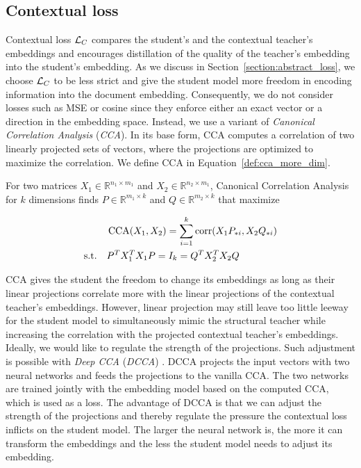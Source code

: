 \subsection{Contextual loss}\label{section:contextual_loss}

Contextual loss $\mathcal{L}_C$ compares the student's and the contextual teacher's
embeddings and encourages distillation of the quality of the teacher's
embedding into the student's embedding. As we discuss in
Section~\ref{section:abstract_loss}, we choose $\mathcal{L}_C$ to be less strict and
give the student model more freedom in encoding information into the
document embedding. Consequently, we do not consider losses such as MSE or
cosine since they enforce either an exact vector or a direction in the
embedding space. Instead, we use a variant of \emph{Canonical Correlation
Analysis} \citep{hotelling1992relations} (\emph{CCA}). In its base form, CCA
computes a correlation of two linearly projected sets of vectors, where the
projections are optimized to maximize the correlation. We define CCA
in Equation~\ref{def:cca_more_dim}.

\begin{defn}\label{def:cca_more_dim}

  For two matrices $X_1 \in \mathbb{R}^{n_1 \times m_1}$ and $X_2 \in
  \mathbb{R}^{n_2 \times m_1}$, Canonical Correlation Analysis for $k$
  dimensions finds $P \in \mathbb{R}^{m_1 \times k}$ and $Q \in \mathbb{R}^{m_2
  \times k}$ that maximize

  \begin{equation}
    \begin{split}
      &\operatorname*{CCA}(X_1, X_2) = \sum_{i = 1}^k \operatorname*{corr}(X_1P_{*i}, X_2Q_{*i}) \\
      \text{s.t.}\quad &P^TX_1^TX_1P = I_k = Q^TX_2^TX_2Q \\
    \end{split}
  \end{equation}


\end{defn}

CCA gives the student the freedom to change its embeddings as long as their
linear projections correlate more with the linear projections of the contextual
teacher's embeddings. However, linear projection may still leave too little
leeway for the student model to simultaneously mimic the structural teacher
while increasing the correlation with the projected contextual teacher's
embeddings. Ideally, we would like to regulate the strength of the projections.
Such adjustment is possible with \emph{Deep CCA} (\emph{DCCA})
\citep{andrew2013deep}. DCCA projects the input vectors with two neural
networks and feeds the projections to the vanilla CCA. The two networks are
trained jointly with the embedding model based on the computed CCA, which is
used as a loss. The advantage of DCCA is that we can adjust the strength of the
projections and thereby regulate the pressure the contextual loss inflicts on
the student model. The larger the neural network is, the more it can transform
the embeddings and the less the student model needs to adjust its embedding.

